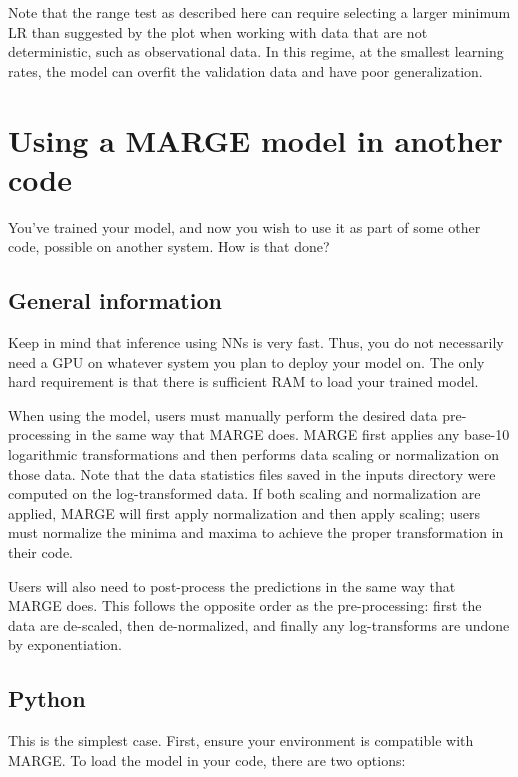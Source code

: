 \documentclass[letterpaper, 12pt]{article}
\begin{document}
\noindent Note that the range test as described here can require selecting a 
larger minimum LR than suggested by the plot when working with data that 
are not deterministic, such as observational data.  In this regime, at the 
smallest learning rates, the model can overfit the validation data and have 
poor generalization.


\section{Using a MARGE model in another code}

You've trained your model, and now you wish to use it as part of some other 
code, possible on another system.  How is that done?

\subsection{General information}
\label{sec:generalusemodel}

Keep in mind that inference using NNs is very fast. Thus, you do not necessarily 
need a GPU on whatever system you plan to deploy your model on.  The only 
hard requirement is that there is sufficient RAM to load your trained model. \newline

\noindent When using the model, users must manually perform the desired data 
pre-processing in the same way that MARGE does.  MARGE first applies any base-10 
logarithmic transformations and then performs data scaling or normalization 
on those data.  Note that the data statistics files saved in the inputs directory 
were computed on the log-transformed data.  If both scaling and normalization 
are applied, MARGE will first apply normalization and then apply scaling; users 
must normalize the minima and maxima to achieve the proper transformation 
in their code. \newline

\noindent Users will also need to post-process the predictions in the same way 
that MARGE does.  This follows the opposite order as the pre-processing: first 
the data are de-scaled, then de-normalized, and finally any log-transforms are 
undone by exponentiation.

\subsection{Python}

This is the simplest case.  First, ensure your environment is compatible with 
MARGE.  To load the model in your code, there are two options: 
\end{document}
